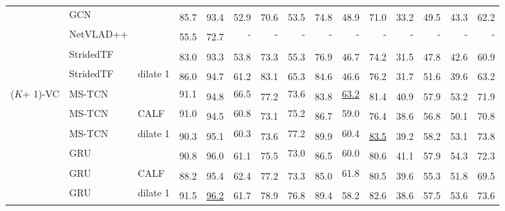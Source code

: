 \documentclass[runningheads]{llncs}
\newcommand{\notation}[1]{\ensuremath{#1}\xspace}
\newcommand{\NumClasses}{\notation{K}}
\newcommand{\best}[1]{\underline{#1}}
\newcommand{\nms}{\textsuperscript{\textdagger}}
\begin{document}
\begin{table*}[p]
{\begin{tabularx}{\textwidth}{lll
        rr
        rr
        rr
        rr
        rr
        rr
    }
        & GCN &
            & \nms 85.7 & \nms 93.4 & \nms 52.9 & \nms 70.6 & \nms 53.5 & \nms 74.8 & \nms 48.9 & \nms 71.0 & \nms 33.2 & \nms 49.5 & \nms 43.3 & \nms 62.2 \\

        & NetVLAD++ &
            & \nms 55.5 & \nms 72.7 & - & - & - & - & - & - & - & - & - & - \\

        \cmidrule{2-15}
        & StridedTF &
            & \nms 83.0 & \nms 93.3 & \nms 53.8 & \nms 73.3 & \nms 55.3 & \nms 76.9 & \nms 46.7 & \nms 74.2 & \nms 31.5 & \nms 47.8 & \nms 42.6 & \nms 60.9 \\

        & StridedTF & dilate 1
            & \nms 86.0 & \nms 94.7 & \nms 61.2 & \nms 83.1 & \nms 65.3 & \nms 84.6 & \nms 46.6 & \nms 76.2 & \nms 31.7 & \nms 51.6 & \nms 39.6 & \nms 63.2 \\

        \cmidrule{2-15}
        (\NumClasses + 1)-VC
        & MS-TCN &
            & 91.1 & \nms 94.8 & 66.5 & \nms 77.2 & 73.6 & \nms 83.8 & \best{63.2} & \nms 81.4 & \nms 40.9 & \nms 57.9 & \nms 53.2 & \nms 71.9 \\

        & MS-TCN & CALF
            & 91.0 & \nms 94.5 & 60.8 & \nms 73.1 & 75.2 & \nms 86.7 & 59.0 & \nms 76.4 & \nms 38.6 & \nms 56.8 & \nms 50.1 & \nms 70.8 \\

        & MS-TCN & dilate 1
            & \nms 90.3 & \nms 95.1 & 60.3 & \nms 73.6 & 77.2 & \nms 89.9 & 60.4 & \nms \best{83.5} & \nms 39.2 & \nms 58.2 & \nms 53.1 & \nms 73.8 \\

        \cmidrule{2-15}
        & GRU &
            & \nms 90.8 & \nms 96.0 & \nms 61.1 & \nms 75.5 & 73.0 & \nms 86.5 & 60.0 & \nms 80.6 & \nms 41.1 & \nms 57.9 & \nms 54.3 & \nms 72.3 \\

        & GRU & CALF
            & \nms 88.2 & \nms 95.4 & \nms 62.4 & \nms 77.2 & \nms 73.3 & \nms 85.0 & 61.8 & \nms 80.5 & \nms 39.6 & \nms 55.3 & \nms 51.8 & \nms 69.5 \\

        & GRU & dilate 1
            & \nms 91.5 & \nms \best{96.2} & \nms 61.7 & \nms 78.9 & \nms 76.8 & \nms 89.4 & \nms 58.2 & \nms 82.6 & \nms 38.6 & \nms 57.5 & \nms 53.6 & \nms 73.6 \\


\end{tabularx}}
\end{table*}
\end{document}
